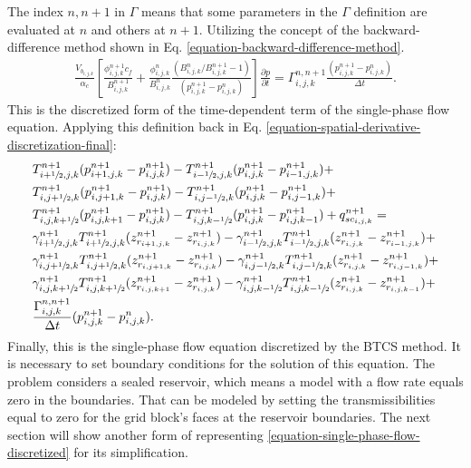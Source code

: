 %
The index $n,n+1$ in $\Gamma$ means that some parameters in the $\Gamma$ definition are evaluated at $n$ and others at $n+1$.
%
Utilizing the concept of the backward-difference method shown in Eq. \ref{equation-backward-difference-method}.
%
\begin{multline}
	\label{equation-time-derivative-discretization-final}
	\frac {V_{b_{i,j,k}}}{\alpha_c} \left[ \frac{\phi^{n+1}_{i,j,k} c_f}{B^{n+1}_{i,j,k}} + \frac{\phi^n_{i,j,k}}{B^n_{i,j,k}} \frac{ \left( B^n_{i,j,k}/B^{n+1}_{i,j,k}-1\right) } { (p^{n+1}_{i,j,k} - p^{n}_{i,j,k}) } \right] \frac{\partial p}{\partial t} = \Gamma^{n,n+1}_{i,j,k} \frac{(p^{n+1}_{i,j,k} - p^{n}_{i,j,k})}{\Delta t}.
\end{multline}
%
This is the discretized form of the time-dependent term of the single-phase flow equation.
%
Applying this definition back in Eq. \ref{equation-spatial-derivative-discretization-final}:
%
\begin{align}\nonumber
	\label{equation-single-phase-flow-discretized}
	& T^{n+1}_{i+\sfrac{1}{2},j,k}(p^{n+1}_{i+1,j,k}-p^{n+1}_{i,j,k}) - T^{n+1}_{i-\sfrac{1}{2},j,k}(p^{n+1}_{i,j,k}-p^{n+1}_{i-1,j,k}) \nonumber +\\ &
	T^{n+1}_{i,j+\sfrac{1}{2},k}(p^{n+1}_{i,j+1,k}-p^{n+1}_{i,j,k}) - T^{n+1}_{i,j-\sfrac{1}{2},k}(p^{n+1}_{i,j,k}-p^{n+1}_{i,j-1,k}) \nonumber +\\ &
	T^{n+1}_{i,j,k+\sfrac{1}{2}}(p^{n+1}_{i,j,k+1}-p^{n+1}_{i,j,k}) - T^{n+1}_{i,j,k-\sfrac{1}{2}}(p^{n+1}_{i,j,k}-p^{n+1}_{i,j,k-1})
	\nonumber +
	q^{n+1}_{sc_{i,j,k}} =\\ &
	\gamma^{n+1}_{i+\sfrac{1}{2},j,k} T^{n+1}_{i+\sfrac{1}{2},j,k}(z^{n+1}_{r_{i+1,j,k}}-z^{n+1}_{r_{i,j,k}}) - \gamma^{n+1}_{i-\sfrac{1}{2},j,k} T^{n+1}_{i-\sfrac{1}{2},j,k}(z^{n+1}_{r_{i,j,k}}-z^{n+1}_{r_{i-1,j,k}}) \nonumber +\\ &
	\gamma^{n+1}_{i,j+\sfrac{1}{2},k} T^{n+1}_{i,j+\sfrac{1}{2},k}(z^{n+1}_{r_{i,j+1,k}}-z^{n+1}_{r_{i,j,k}}) - \gamma^{n+1}_{i,j-\sfrac{1}{2},k} T^{n+1}_{i,j-\sfrac{1}{2},k}(z^{n+1}_{r_{i,j,k}}-z^{n+1}_{r_{i,j-1,k}}) \nonumber +\\ &
	\gamma^{n+1}_{i,j,k+\sfrac{1}{2}} T^{n+1}_{i,j,k+\sfrac{1}{2}}(z^{n+1}_{r_{i,j,k+1}}-z^{n+1}_{r_{i,j,k}}) - \gamma^{n+1}_{i,j,k-\sfrac{1}{2}} T^{n+1}_{i,j,k-\sfrac{1}{2}}(z^{n+1}_{r_{i,j,k}}-z^{n+1}_{r_{i,j,k-1}}) \nonumber +\\ &
	\frac{\Gamma_{i,j,k}^{n,n+1}}{\Delta t} (p_{i,j,k}^{n+1}-p_{i,j,k}^n).
\end{align}
%
Finally, this is the single-phase flow equation discretized by the BTCS method.
%
It is necessary to set boundary conditions for the solution of this equation.
%
The problem considers a sealed reservoir, which means a model with a flow rate equals zero in the boundaries.
%
That can be modeled by setting the transmissibilities equal to zero for the grid block's faces at the reservoir boundaries.
%
The next section will show another form of representing \ref{equation-single-phase-flow-discretized} for its simplification.	

